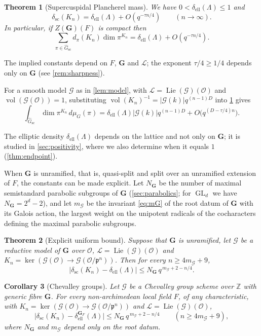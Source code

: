\documentclass[11pt,reqno]{amsart}
\numberwithin{equation}{section}
\theoremstyle{plain}
\newtheorem{theorem}{Theorem}[section]
\newtheorem{corollary}[theorem]{Corollary}
\theoremstyle{definition}
\theoremstyle{remark}
\theoremstyle{plain}
\newcommand{\Z}{\mathbb{Z}}      %
\newcommand{\OO}{\mathcal{O}}    %
\newcommand{\pp}{\mathfrak{p}}   %
\newcommand{\Lat}{\mathcal{L}}   %
\newcommand{\dLat}{\Lambda}      %
\newcommand{\bG}{\mathbf{G}}     %
\newcommand{\g}{\mathfrak{g}}    %
\newcommand{\gd}{\mathfrak{g}^*} %
\newcommand{\scd}[1]{\delta_{\mathrm{sc}}(#1)}
\newcommand{\fdeg}[1]{d_{#1}}  %
\newcommand{\elld}[2][]{\delta_{\mathrm{ell}}^{#1}(#2)}  %
\newcommand{\Pcss}{\mathscr{P}^{\mathrm{ss}}_{\mathrm{max}}}  %
\newcommand{\Nss}{N_{\bG}}  %
\newcommand{\Gsc}{\widehat{G}_{\mathrm{sc}}}    %
\newcommand{\cG}{\mathcal{G}}                   %
\newcommand{\abs}[1]{\lvert#1\rvert}
\DeclareMathOperator{\vol}{vol}
\DeclareMathOperator{\Lie}{Lie}
\DeclareMathOperator{\GL}{GL}
\newcommand{\eexp}{\tau}
\begin{document}
\begin{theorem}[Supercuspidal Plancherel mass]\label{thm:main}
We have $0<\elld{\dLat}\le1$ and
\begin{equation}\label{eq:main}
\scd{K_n}=\elld{\dLat}+O(q^{-\eexp n/4})\qquad(n\to\infty).
\end{equation}
In particular, if $Z(\bG)(F)$ is compact then
\begin{equation}\label{eq:formal}
\sum_{\pi\in\Gsc}\fdeg{\pi}(K_n)\dim\pi^{K_n}=\elld{\dLat}+O(q^{-\eexp n/4}).
\end{equation}
\end{theorem}

The implied constants depend on $F$, $\bG$ and $\Lat$; the exponent
$\eexp/4\ge1/4$ depends only on $\bG$ (see \cref{rem:sharpness}).

For a smooth model $\cG$ as in \cref{lem:model}, with
$\Lat=\Lie(\cG)(\OO)$ and $\vol(\cG(\OO))=1$, substituting
$\vol(K_n)^{-1}=\abs{\cG(k)}q^{(n-1)D}$ into \cref{thm:main} gives
\[
\int_{\Gsc}\dim\pi^{K_n}\,d\mu_G(\pi)=\elld{\dLat}\abs{\cG(k)}q^{(n-1)D}+O\bigl(q^{(D-\eexp/4)n}\bigr).
\]

The elliptic density $\elld{\dLat}$ depends on the lattice and not
only on $\bG$; it is studied in \cref{sec:positivity}, where we also
determine when it equals $1$ (\cref{thm:endpoint}).

When $\bG$ is unramified, that is, quasi-split and split over an unramified
extension of $F$, the constants can be made explicit. Let $\Nss$ be the number of maximal semistandard parabolic subgroups of
$\bG$ (\cref{sec:parabolics}; for $\GL_d$ we have $\Nss=2^d-2$), and let
$m_{\cG}$ be the invariant \eqref{eq:mG} of the root datum of $\bG$ with its
Galois action, the largest weight on the unipotent radicals of the
cocharacters defining the maximal parabolic subgroups.

\begin{theorem}[Explicit uniform bound]\label{thm:uniform}
Suppose that $\bG$ is unramified, let $\cG$ be a reductive model of $\bG$ over
$\OO$, $\Lat=\Lie(\cG)(\OO)$ and $K_n=\ker(\cG(\OO)\to\cG(\OO/\pp^n))$. Then
for every $n\ge4m_{\cG}+9$,
\begin{equation}\label{eq:explicitbound}
\bigl|\scd{K_n}-\elld{\dLat}\bigr|\le \Nss\,q^{\,m_{\cG}+2-n/4}.
\end{equation}
\end{theorem}

\begin{corollary}[Chevalley groups]\label{cor:chevalley}
Let $\cG$ be a Chevalley group scheme over $\Z$ with generic fibre $\bG$. For
every non-archimedean local field $F$, of any characteristic, with
$K_n=\ker(\cG(\OO)\to\cG(\OO/\pp^n))$ and $\Lat=\Lie(\cG)(\OO)$,
\[
\bigl|\scd{K_n}-\elld[\bG_F]{\dLat}\bigr|\le \Nss\,q^{\,m_{\cG}+2-n/4}\qquad(n\ge4m_{\cG}+9),
\]
where $\Nss$ and $m_{\cG}$ depend only on the root datum.
\end{corollary}
\end{document}
